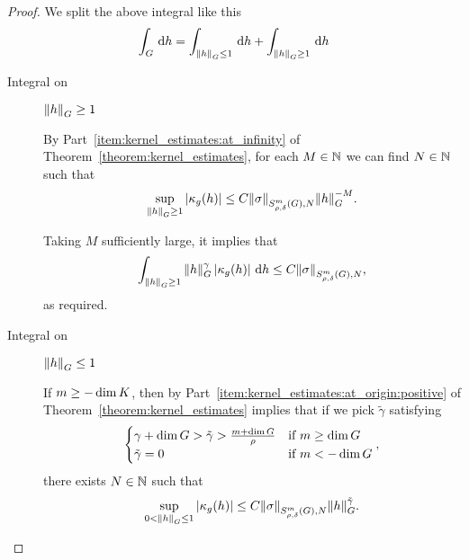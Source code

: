\begin{proof}
    We split the above integral like this
    \begin{align*}
        \int_\Group \dd h
        = \int_{\norm [\Group] h \leq 1} \dd h
        + \int_{\norm [\Group] h \geq 1} \dd h
    \end{align*}

    \begin{description}
        \item [Integral on] $\norm [\Group] h \geq 1$

            By Part~\eqref{item:kernel_estimates:at_infinity} of
            Theorem~\ref{theorem:kernel_estimates},
            for each $M \in \N$ we can find $N \in \N$ such that
            \begin{align*}
                \sup_{\norm [\Group] {h} \geq 1} \abs {\kappa_g(h)}
                \leq C \SymbolSemiNorm m {\rho, \delta} N \sigma \norm [\Group] h^{-M}.
            \end{align*}

            Taking $M$ sufficiently large, it implies that
            \begin{align*}
                \int_{\norm [\Group] h \geq 1} \norm [\Group] h^\gamma \abs {\kappa_g(h)} \dd h
                \leq C \SymbolSemiNorm m {\rho, \delta} N \sigma,
            \end{align*}
            as required.

        \item [Integral on] $\norm [\Group] h \leq 1$

            If $m \geq -\dim \CompactGroup$,
            then by Part~\eqref{item:kernel_estimates:at_origin:positive} of Theorem~\ref{theorem:kernel_estimates} implies
            that if we pick $\tilde \gamma$ satisfying
            \begin{align}
                \begin{cases}
                    \gamma + \dim \Group > \tilde \gamma > \frac {m + \dim \Group} \rho & \text{if } m \geq \dim \Group\\
                    \tilde \gamma = 0 & \text{if } m < -\dim \Group
                \end{cases},
                \label{eq:consequence_of_kernel_estimates:choice_of_tilde_gamma}
            \end{align}
            there exists $N \in \N$ such that
            \begin{align*}
                \sup_{0 < \norm [\Group] h \leq 1} \abs{\kappa_g(h)}
                \leq
                    C \SymbolSemiNorm m {\rho, \delta} N \sigma \norm [\Group] h^{\tilde \gamma}.
            \end{align*}


\end{description}
\end{proof}
